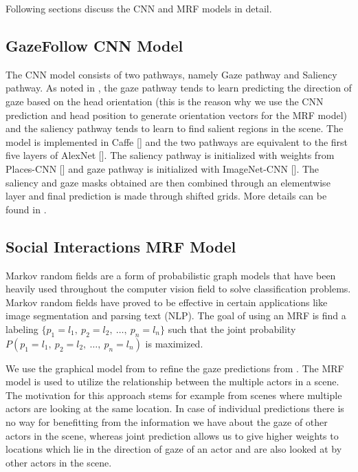 \documentclass[10pt,twocolumn,letterpaper]{article}
\begin{document}
Following sections discuss the CNN and MRF models in detail.

\subsection{GazeFollow CNN Model}

The CNN model consists of two pathways, namely Gaze pathway and Saliency pathway. As noted in \cite{nips15_recasens}, the gaze pathway tends to learn predicting the direction of gaze based on the head orientation (this is the reason why we use the CNN prediction and head position to generate orientation vectors for the MRF model) and the saliency pathway tends to learn to find salient regions in the scene. The model is implemented in Caffe [] and the two pathways are equivalent to the first five layers of AlexNet []. The saliency pathway is initialized with weights from Places-CNN [] and gaze pathway is initialized with ImageNet-CNN [].
The saliency and gaze masks obtained are then combined through an elementwise layer and final prediction is made through shifted grids. More details can be found in \cite{nips15_recasens}.

\subsection{Social Interactions MRF Model}

Markov random fields are a form of probabilistic graph models that have been heavily used throughout the computer vision field to solve classification problems. Markov random fields have proved to be effective in certain applications like image segmentation and parsing text (NLP). The goal of using an MRF is find a labeling $\{p_1 = l_1,\ p_2 = l_2,\ \dots,\ p_n = l_n\}$ such that the joint probability $P(p_1 = l_1,\ p_2 = l_2,\ \dots,\ p_n = l_n)$ is maximized.

We use the graphical model from \cite{fathi2012social} to refine the gaze predictions from \cite{nips15_recasens}. The MRF model is used to utilize the relationship between the multiple actors in a scene. The motivation for this approach stems for example from scenes where multiple actors are looking at the same location. In case of individual predictions there is no way for benefitting from the information we have about the gaze of other actors in the scene, whereas joint prediction allows us to give higher weights to locations which lie in the direction of gaze of an actor and are also looked at by other actors in the scene.
\end{document}
